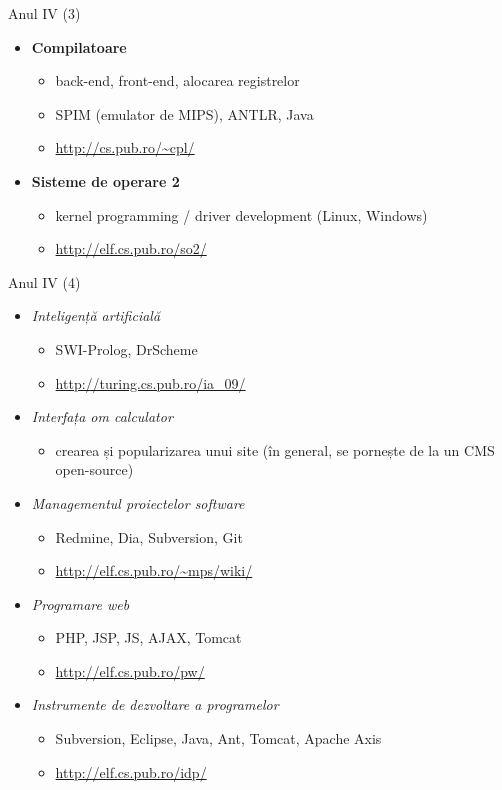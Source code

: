 \documentclass{simple}
\begin{document}
\begin{frame}{Anul IV (3)}
	\begin{itemize}
		\item \textbf{Compilatoare}
			\begin{itemize}
				\item back-end, front-end, alocarea registrelor
				\item SPIM (emulator de MIPS), ANTLR, Java
				\item \url{http://cs.pub.ro/~cpl/}
			\end{itemize}
		\item \textbf{Sisteme de operare 2}
			\begin{itemize}
				\item kernel programming / driver development (Linux, Windows)
				\item \url{http://elf.cs.pub.ro/so2/}
			\end{itemize}
	\end{itemize}
\end{frame}

\begin{frame}{Anul IV (4)}
	\begin{itemize}
		\item \textit{Inteligență artificială}
			\begin{itemize}
				\item SWI-Prolog, DrScheme
				\item \url{http://turing.cs.pub.ro/ia_09/}
			\end{itemize}
		\item \textit{Interfața om calculator}
			\begin{itemize}
				\item crearea și popularizarea unui site (în general, se
				pornește de la un CMS open-source)
			\end{itemize}
		\item \textit{Managementul proiectelor software}
			\begin{itemize}
				\item Redmine, Dia, Subversion, Git
				\item \url{http://elf.cs.pub.ro/~mps/wiki/}
			\end{itemize}
		\item \textit{Programare web}
			\begin{itemize}
				\item PHP, JSP, JS, AJAX, Tomcat
				\item \url{http://elf.cs.pub.ro/pw/}
			\end{itemize}
		\item \textit{Instrumente de dezvoltare a programelor}
			\begin{itemize}
				\item Subversion, Eclipse, Java, Ant, Tomcat, Apache Axis
				\item \url{http://elf.cs.pub.ro/idp/}
			\end{itemize}
	\end{itemize}
\end{frame}
\end{document}
